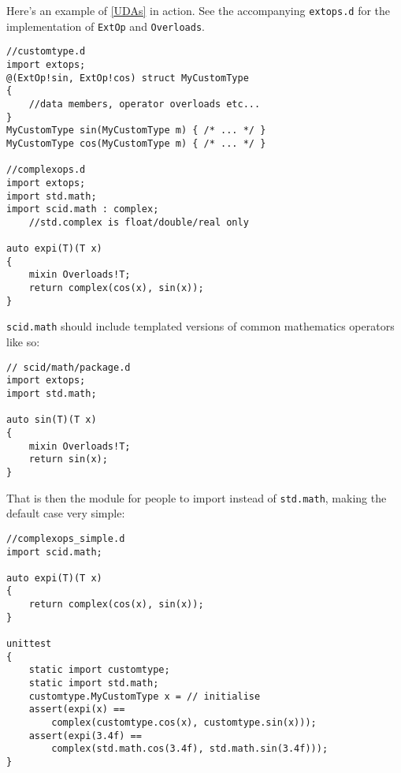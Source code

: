 \documentclass[10pt,a5paper,DIV=13]{scrartcl}
\begin{document}
Here's an example of \ref{UDAs} in action. See the accompanying \texttt{extops.d} for the implementation of \texttt{ExtOp} and \texttt{Overloads}.
\begin{verbatim}
//customtype.d
import extops;
@(ExtOp!sin, ExtOp!cos) struct MyCustomType
{
    //data members, operator overloads etc...
}
MyCustomType sin(MyCustomType m) { /* ... */ }
MyCustomType cos(MyCustomType m) { /* ... */ }

//complexops.d
import extops;
import std.math;
import scid.math : complex;
    //std.complex is float/double/real only

auto expi(T)(T x)
{
    mixin Overloads!T;
    return complex(cos(x), sin(x));
}
\end{verbatim}

\texttt{scid.math} should include templated versions of common mathematics operators like so:

\begin{verbatim}
// scid/math/package.d
import extops;
import std.math;

auto sin(T)(T x)
{
    mixin Overloads!T;
    return sin(x);
}
\end{verbatim}

That is then the module for people to import instead of \texttt{std.math}, making the default case very simple:

\begin{verbatim}
//complexops_simple.d
import scid.math;

auto expi(T)(T x)
{
    return complex(cos(x), sin(x));
}

unittest
{
    static import customtype;
    static import std.math;
    customtype.MyCustomType x = // initialise
    assert(expi(x) ==
        complex(customtype.cos(x), customtype.sin(x)));
    assert(expi(3.4f) ==
        complex(std.math.cos(3.4f), std.math.sin(3.4f)));
}
\end{verbatim}
\end{document}
